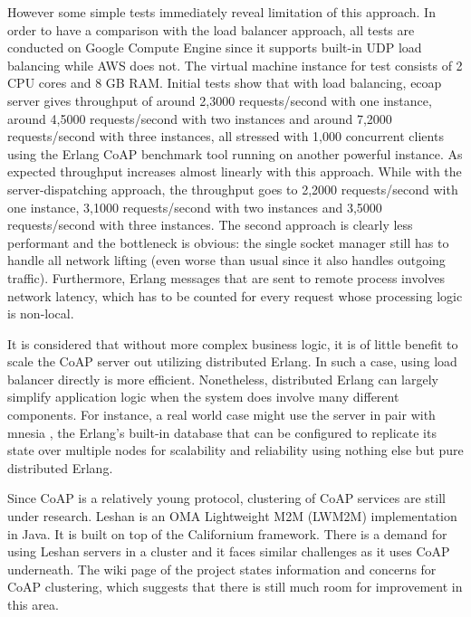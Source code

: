 However some simple tests immediately reveal limitation of this approach. In order to have a comparison with the load balancer approach, all tests are conducted on Google Compute Engine \autocite{google_compute_engine} since it supports built-in UDP load balancing while AWS does not. The virtual machine instance for test consists of 2 CPU cores and 8 GB RAM. Initial tests show that with load balancing, ecoap server gives throughput of around 2,3000 requests/second with one instance, around 4,5000 requests/second with two instances and around 7,2000 requests/second with three instances, all stressed with 1,000 concurrent clients using the Erlang CoAP benchmark tool running on another powerful instance. As expected throughput increases almost linearly with this approach. While with the server-dispatching approach, the throughput goes to 2,2000 requests/second with one instance, 3,1000 requests/second with two instances and 3,5000 requests/second with three instances. The second approach is clearly less performant and the bottleneck is obvious: the single socket manager still has to handle all network lifting (even worse than usual since it also handles outgoing traffic). Furthermore, Erlang messages that are sent to remote process involves network latency, which has to be counted for every request whose processing logic is non-local.

It is considered that without more complex business logic, it is of little benefit to scale the CoAP server out utilizing distributed Erlang. In such a case, using load balancer directly is more efficient. Nonetheless, distributed Erlang can largely simplify application logic when the system does involve many different components. For instance, a real world case might use the server in pair with mnesia \autocite{mnesia}, the Erlang's built-in database that can be configured to replicate its state over multiple nodes for scalability and reliability using nothing else but pure distributed Erlang. 

Since CoAP is a relatively young protocol, clustering of CoAP services are still under research. Leshan \autocite{leshan} is an OMA Lightweight M2M (LWM2M) implementation in Java. It is built on top of the Californium framework. There is a demand for using Leshan servers in a cluster and it faces similar challenges as it uses CoAP underneath. The wiki page of the project \autocite{leshan_cluster} states information and concerns for CoAP clustering, which suggests that there is still much room for improvement in this area.

